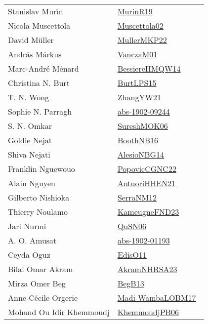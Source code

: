 {\begin{longtable}{p{4cm}p{20cm}}
Stanislav Mur{\'{\i}}n & \href{works/MurinR19.pdf}{MurinR19}~\cite{MurinR19}\\
Nicola Muscettola & \href{works/Muscettola02.pdf}{Muscettola02}~\cite{Muscettola02}\\
David M{\"{u}}ller & \href{works/MullerMKP22.pdf}{MullerMKP22}~\cite{MullerMKP22}\\
Andr{\'{a}}s M{\'{a}}rkus & \href{works/VanczaM01.pdf}{VanczaM01}~\cite{VanczaM01}\\
Marc{-}Andr{\'{e}} M{\'{e}}nard & \href{works/BessiereHMQW14.pdf}{BessiereHMQW14}~\cite{BessiereHMQW14}\\
Christina N. Burt & \href{works/BurtLPS15.pdf}{BurtLPS15}~\cite{BurtLPS15}\\
T. N. Wong & \href{works/ZhangYW21.pdf}{ZhangYW21}~\cite{ZhangYW21}\\
Sophie N. Parragh & \href{works/abs-1902-09244.pdf}{abs-1902-09244}~\cite{abs-1902-09244}\\
S. N. Omkar & \href{works/SureshMOK06.pdf}{SureshMOK06}~\cite{SureshMOK06}\\
Goldie Nejat & \href{works/BoothNB16.pdf}{BoothNB16}~\cite{BoothNB16}\\
Shiva Nejati & \href{works/AlesioNBG14.pdf}{AlesioNBG14}~\cite{AlesioNBG14}\\
Franklin Nguewouo & \href{works/PopovicCGNC22.pdf}{PopovicCGNC22}~\cite{PopovicCGNC22}\\
Alain Nguyen & \href{works/AntuoriHHEN21.pdf}{AntuoriHHEN21}~\cite{AntuoriHHEN21}\\
Gilberto Nishioka & \href{works/SerraNM12.pdf}{SerraNM12}~\cite{SerraNM12}\\
Thierry Noulamo & \href{works/KameugneFND23.pdf}{KameugneFND23}~\cite{KameugneFND23}\\
Jari Nurmi & \href{works/QuSN06.pdf}{QuSN06}~\cite{QuSN06}\\
A. O. Amusat & \href{works/abs-1902-01193.pdf}{abs-1902-01193}~\cite{abs-1902-01193}\\
Ceyda Oguz & \href{works/EdisO11.pdf}{EdisO11}~\cite{EdisO11}\\
Bilal Omar Akram & \href{works/AkramNHRSA23.pdf}{AkramNHRSA23}~\cite{AkramNHRSA23}\\
Mirza Omer Beg & \href{works/BegB13.pdf}{BegB13}~\cite{BegB13}\\
Anne{-}C{\'{e}}cile Orgerie & \href{works/Madi-WambaLOBM17.pdf}{Madi-WambaLOBM17}~\cite{Madi-WambaLOBM17}\\
Mohand Ou Idir Khemmoudj & \href{works/KhemmoudjPB06.pdf}{KhemmoudjPB06}~\cite{KhemmoudjPB06}\\

\end{longtable}}
